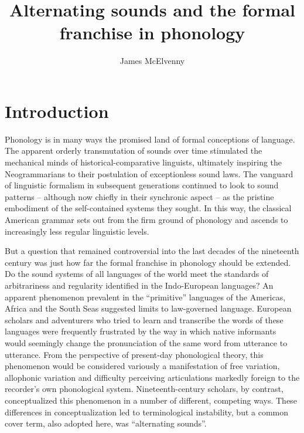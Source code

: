 \documentclass[output=paper]{langscibook}
\author{James McElvenny\affiliation{University of Edinburgh}}
\title{Alternating sounds and the formal franchise in phonology}
\begin{document}
\maketitle

\section{Introduction}
\label{sec:mcelvenny:intro}

Phonology is in many ways the promised land of formal conceptions of language. The apparent orderly transmutation of sounds over time stimulated the mechanical minds of historical-comparative linguists, ultimately inspiring the Neogrammarians to their postulation of exceptionless sound laws. The vanguard of linguistic formalism in subsequent generations continued to look to sound patterns -- although now chiefly in their synchronic aspect -- as the pristine embodiment of the self-contained systems they sought. In this way, the classical American  grammar sets out from the firm ground of phonology and ascends to increasingly less regular linguistic levels.

But a question that remained controversial into the last decades of the nineteenth century was just how far the formal franchise in phonology should be extended. Do the sound systems of all languages of the world meet the standards of arbitrariness and regularity identified in the Indo-European languages? An apparent phenomenon prevalent in the ``primitive'' languages of the Americas, Africa and the South Seas suggested limits to law-governed language. European scholars and adventurers who tried to learn and transcribe the words of these languages were frequently frustrated by the way in which native informants would seemingly change the pronunciation of the same word from utterance to utterance. From the perspective of present-day phonological theory, this phenomenon would be considered variously a manifestation of free variation, allophonic variation and difficulty perceiving articulations markedly foreign to the recorder's own phonological system. Nineteenth-century scholars, by contrast, conceptualized this phenomenon in a number of different, competing ways. These differences in conceptualization led to terminological instability, but a common cover term, also adopted here, was ``alternating sounds''.
\end{document}
